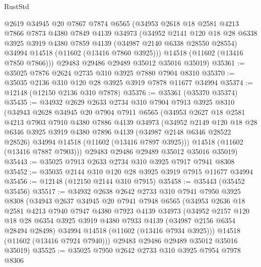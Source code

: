 \begin{lexlean}{RustStd}
\begin{coremodule}
      @2619
      @34945
      @20
      @7867
      @7874
      @6565
      (@34953
        @2618
        @18
        @2581
        @4213
        @7866
        @7873
        @4380
        @7849
        @4139
        @34973
        (@34952
          @2141
          @120
          @18
          @28
          @6338
          @3925
          @3919
          @4380
          @7859
          @4139
          (@34987 @2140 @6338 @28550 @28554)
          @34994
          @14518
          (@11602 (@13416 @7860 @3925)))
        @14518
        (@11602 (@13416 @7850 @7866)))
      @29483
      @29486
      @29489
      @35012
      @35016
      @35019)
@35361 := @35025 @7876 @2624 @2735 @310 @3925 @7880 @7904 @8310
@35370 := @35035 @2136 @310 @120 @28 @3925 @3919 @7878 @11677 @34994
@35374 := @12148 (@12150 @2136 @310 @7878)
@35376 := @35361 (@35370 @35374)
@35435 := @34932
    @2629
    @2633
    @2734
    @310
    @7904
    @7913
    @3925
    @8310
    (@34943
      @2628
      @34945
      @20
      @7904
      @7911
      @6565
      (@34953
        @2627
        @18
        @2581
        @4213
        @7903
        @7910
        @4380
        @7886
        @4139
        @34973
        (@34952
          @2149
          @120
          @18
          @28
          @6346
          @3925
          @3919
          @4380
          @7896
          @4139
          (@34987 @2148 @6346 @28522 @28526)
          @34994
          @14518
          (@11602 (@13416 @7897 @3925)))
        @14518
        (@11602 (@13416 @7887 @7903)))
      @29483
      @29486
      @29489
      @35012
      @35016
      @35019)
@35443 := @35025 @7913 @2633 @2734 @310 @3925 @7917 @7941 @8308
@35452 := @35035 @2144 @310 @120 @28 @3925 @3919 @7915 @11677 @34994
@35456 := @12148 (@12150 @2144 @310 @7915)
@35458 := @35443 (@35452 @35456)
@35517 := @34932
    @2638
    @2642
    @2733
    @310
    @7941
    @7950
    @3925
    @8308
    (@34943
      @2637
      @34945
      @20
      @7941
      @7948
      @6565
      (@34953
        @2636
        @18
        @2581
        @4213
        @7940
        @7947
        @4380
        @7923
        @4139
        @34973
        (@34952
          @2157
          @120
          @18
          @28
          @6354
          @3925
          @3919
          @4380
          @7933
          @4139
          (@34987 @2156 @6354 @28494 @28498)
          @34994
          @14518
          (@11602 (@13416 @7934 @3925)))
        @14518
        (@11602 (@13416 @7924 @7940)))
      @29483
      @29486
      @29489
      @35012
      @35016
      @35019)
@35525 := @35025 @7950 @2642 @2733 @310 @3925 @7954 @7978 @8306

\end{coremodule}
\end{lexlean}
